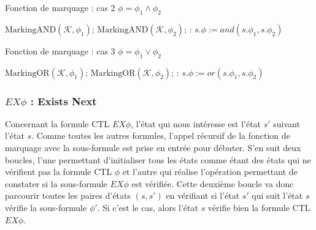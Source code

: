 \documentclass[runningheads,a4paper,10pt]{llncs}
\newcommand{\var}[1]{\mathit{#1}}
\newcommand{\func}[1]{\mathrm{#1}}
\begin{document}
\begin{algorithm}
  \caption{Fonction de marquage : cas 2 $\phi = \phi_{1} \wedge \phi_{2}$}\label{euclid}
  \begin{algorithmic}[1]
  \State $\func{MarkingAND}(\mathcal{K}, \phi_{1})$;
  \State $\func{MarkingAND}(\mathcal{K}, \phi_{2})$;
  \ForAll{$\var{s}$ in $\var{S}$}:
  \State $s.\phi := and(s.\phi_{1}, s.\phi_{2})$
  \EndFor
  \EndProcedure
  \end{algorithmic}
\end{algorithm}

\begin{algorithm}
  \caption{Fonction de marquage : cas 3 $\phi = \phi_{1} \vee \phi_{2}$}\label{euclid}
  \begin{algorithmic}[1]
  \State $\func{MarkingOR}(\mathcal{K}, \phi_{1})$;
  \State $\func{MarkingOR}(\mathcal{K}, \phi_{2})$;
  \ForAll{$\var{s}$ in $\var{S}$}:
  \State $s.\phi := or(s.\phi_{1}, s.\phi_{2})$
  \EndFor
  \EndProcedure
  \end{algorithmic}
\end{algorithm}

\newpage
\subsubsection{$EX\phi$ : Exists Next}

Concernant la formule CTL $EX\phi$, l'état qui nous intéresse est l'état $s'$ suivant l'état $s$. Comme toutes les autres formules, l'appel récursif de la fonction de marquage avec la sous-formule est prise en entrée pour débuter. S'en suit deux boucles, l'une permettant d'initialiser tous les états comme étant des états qui ne vérifient pas la formule CTL $\phi$ et l'autre qui réalise l'opération permettant de constater si la sous-formule $EX\phi$ est vérifiée. Cette deuxième boucle va donc parcourir toutes les paires d'états $(s,s')$ en vérifiant si l'état $s'$ qui suit l'état $s$ vérifie la sous-formule $\phi '$. Si c'est le cas, alors l'état $s$ vérifie bien la formule CTL $EX\phi$. 
   
\end{document}
